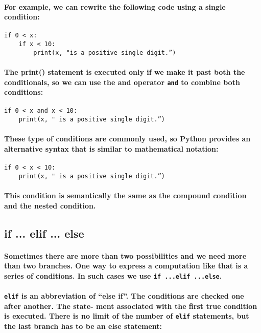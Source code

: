 \documentclass{book}
\begin{document}
\paragraph{For example, we can rewrite the following code using a single condition:}

\begin{verbatim}
if 0 < x:
    if x < 10:
        print(x, "is a positive single digit.”)
\end{verbatim}

\paragraph{The print() statement is executed only if we make it past both the conditionals, so we can use the
and operator \texttt{and} to combine both conditions:}

\begin{verbatim}
if 0 < x and x < 10:
    print(x, " is a positive single digit.”)
\end{verbatim}

\paragraph{These type of conditions are commonly used, so Python provides an alternative syntax that is similar
to mathematical notation:}

\begin{verbatim}
if 0 < x < 10:
    print(x, " is a positive single digit.”)
\end{verbatim}

\paragraph{This condition is semantically the same as the compound condition and the nested condition.}

\subsection*{if ... elif ... else}
\paragraph{Sometimes there are more than two possibilities and we need more than two branches. One way to express a computation like that is a series of conditions. In such cases we use \texttt{if ...elif ...else}.}

\paragraph{\texttt{elif} is an abbreviation of “else if”. The conditions are checked one after another. The state-
ment associated with the first true condition is executed. There is no limit of the number of \texttt{elif}
statements, but the last branch has to be an else statement:}
\end{document}
